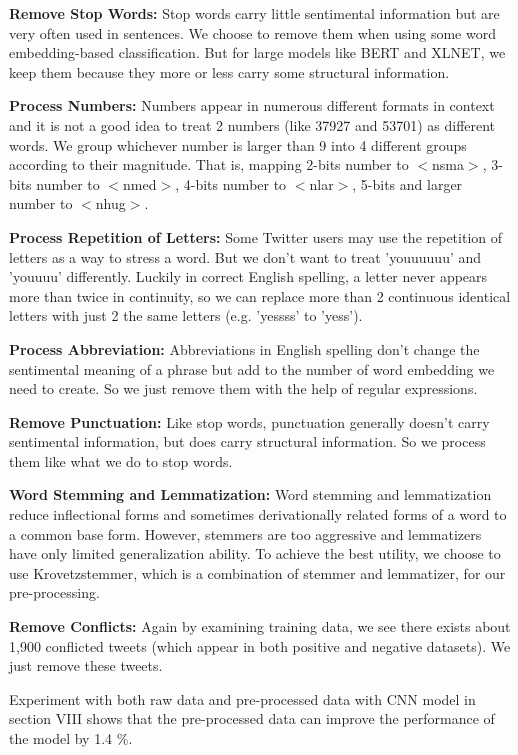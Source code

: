 \documentclass[journal]{IEEEtran}
\begin{document}
\textbf{Remove Stop Words:} Stop words carry little sentimental information but are very often used in sentences. We choose to remove them when using some word embedding-based classification. But for large models like BERT and XLNET, we keep them because they more or less carry some structural information.

\textbf{Process Numbers:} Numbers appear in numerous different formats in context and it is not a good idea to treat 2 numbers (like 37927 and 53701) as different words. We group whichever number is larger than 9 into 4 different groups according to their magnitude. That is, mapping 2-bits number to $<$nsma$>$, 3-bits number to $<$nmed$>$, 4-bits number to $<$nlar$>$, 5-bits and larger number to $<$nhug$>$.

\textbf{Process Repetition of Letters:} Some Twitter users may use the repetition of letters as a way to stress a word. But we don't want to treat 'youuuuuu' and 'youuuu' differently. Luckily in correct English spelling, a letter never appears more than twice in continuity, so we can replace more than 2 continuous identical letters with just 2 the same letters (e.g. 'yessss' to 'yess').

\textbf{Process Abbreviation:} Abbreviations in English spelling don't change the sentimental meaning of a phrase but add to the number of word embedding we need to create. So we just remove them with the help of regular expressions.

\textbf{Remove Punctuation:} Like stop words, punctuation generally doesn't carry sentimental information, but does carry structural information. So we process them like what we do to stop words.

\textbf{Word Stemming and Lemmatization:} Word stemming and lemmatization reduce inflectional forms and sometimes derivationally related forms of a word to a common base form. However, stemmers are too aggressive and lemmatizers have only limited generalization ability. To achieve the best utility, we choose to use Krovetzstemmer\cite{Krovetz_github}, which is a combination of stemmer and lemmatizer, for our pre-processing.

\textbf{Remove Conflicts:} Again by examining training data, we see there exists about 1,900 conflicted tweets (which appear in both positive and negative datasets). We just remove these tweets.

Experiment with both raw data and pre-processed data with CNN model in section VIII shows that the pre-processed data can improve the performance of the model by 1.4 \%.
\end{document}
